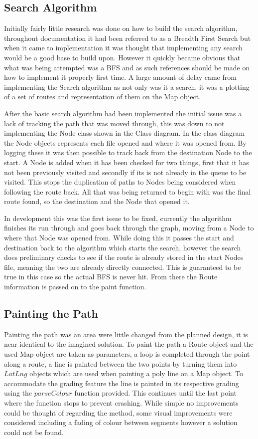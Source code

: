 \subsection{Search Algorithm}

Initially fairly little research was done on how to build the search algorithm, throughout documentation it had been referred to as a Breadth First Search but when it came to implementation it was thought that implementing any search would be a good base to build upon. However it quickly became obvious that what was being attempted was a BFS and as such references should be made on how to implement it properly first time. A large amount of delay came from implementing the Search algorithm as not only was it a search, it was a plotting of a set of routes and representation of them on the Map object. 

After the basic search algorithm had been implemented the initial issue was a lack of tracking the path that was moved through, this was down to not implementing the Node class shown in the Class diagram. In the class diagram the Node objects represents each file opened and where it was opened from. By logging these it was then possible to track back from the destination Node to the start. A Node is added when it has been checked for two things, first that it has not been previously visited and secondly if its is not already in the queue to be visited. This stops the duplication of paths to Nodes being considered when following the route back. All that was being returned to begin with was the final route found, so the destination and the Node that opened it.

In development this was the first issue to be fixed, currently the algorithm finishes its run through and goes back through the graph, moving from a Node to where that Node was opened from. While doing this it passes the start and destination back to the algorithm which starts the search, however the search does preliminary checks to see if the route is already stored in the start Nodes file, meaning the two are already directly connected. This is guaranteed to be true in this case so the actual BFS is never hit. From there the Route information is passed on to the paint function. 

\subsection{Painting the Path}
Painting the path was an area were little changed from the planned design, it is near identical to the imagined solution. To paint the path a Route object and the used Map object are taken as parameters, a loop is completed through the point along a route, a line is painted between the two points by turning them into $LatLng$ objects which are used when painting a poly line on a Map object. To accommodate the grading feature the line is painted in its respective grading using the $parseColour$ function provided. This continues until the last point where the function stops to prevent crashing. While simple no improvements could be thought of regarding the method, some visual improvements were considered including a fading of colour between segments however a solution could not be found. 

